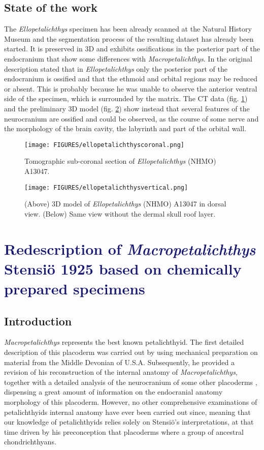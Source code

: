 \documentclass[11pt,letterpaper]{report}
\begin{document}
\section{State of the work}
The \textit{Ellopetalichthys} specimen has been already scanned at the Natural History Museum and the segmentation process of the resulting dataset has already been started. It is preserved in 3D and exhibits ossifications in the posterior part of the endocranium that show some differences with \textit{Macropetalichthys}. In the original description \cite{Ørvig1957} stated that in \textit{Ellopetalichthys} only the posterior part of the endocranium is ossified and that the ethmoid and orbital regions may be reduced or absent. This is probably because he was unable to observe the anterior ventral side of the specimen, which is surrounded by the matrix. The CT data (fig. \ref{ellocoronal}) and the preliminary 3D model (fig. \ref{ello3D}) show instead that several features of the neurocranium are ossified and could be observed, as the course of some nerve and the morphology of the brain cavity, the labyrinth and part of the orbital wall. 

\begin{figure}[!h]
\centering
    \texttt{[image: FIGURES/ellopetalichthyscoronal.png]}
\caption{\footnotesize{Tomographic sub-coronal section of \textit{Ellopetalichthys} (NHMO) A13047.}}
\label{ellocoronal}
\end{figure}

\begin{figure}[!h]
\centering
    \texttt{[image: FIGURES/ellopetalichthysvertical.png]}
\caption{\footnotesize{(Above) 3D model of \textit{Ellopetalichthys} (NHMO) A13047 in dorsal view. (Below) Same view without the dermal skull roof layer.}}
\label{ello3D}
\end{figure}

\newpage
\chapter{\LARGE{\textcolor{MidnightBlue}{Redescription of \textit{Macropetalichthys} {Stensi{\"o} 1925 based on chemically prepared specimens}}}}

\section{Introduction}
\textit{Macropetalichthys} represents the best known petalichthyid. The first detailed description of this placoderm was carried out by \cite{Stensi1925} using mechanical preparation on material from the Middle Devonian of U.S.A. Subsequently, he provided a revision of his reconstruction of the internal anatomy of \textit{Macropetalichthys}, together with a detailed analysis of the neurocranium of some other placoderms \citep{Stensi1963a,Stensi1963b,Stensi1969}, dispensing a great amount of information on the endocranial anatomy morphology of this placoderm. However, no other comprehensive examinations of petalichthyids internal anatomy have ever been carried out since, meaning that our knowledge of petalichthyids relies solely on Stensi{\"o}'s interpretations, at that time driven by his preconception that placoderms where a group of ancestral chondrichthyans. 
\end{document}
